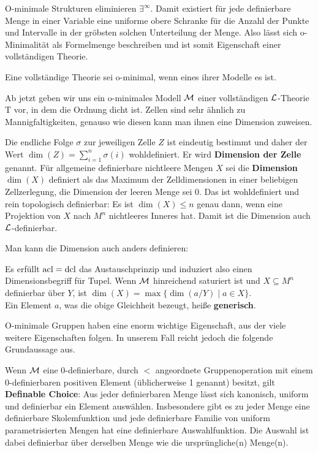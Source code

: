 \begin{corollary}
	O-minimale Strukturen eliminieren $\exists^\infty$. Damit existiert für jede definierbare Menge in einer Variable eine uniforme obere Schranke für die Anzahl der Punkte und Intervalle in der gröbsten solchen Unterteilung der Menge. Also lässt sich o-Minimalität als Formelmenge beschreiben und ist somit Eigenschaft einer vollständigen Theorie.
\end{corollary}

\begin{definition}
	Eine vollständige Theorie sei o-minimal, wenn eines ihrer Modelle es ist.
\end{definition}
\newpage
Ab jetzt geben wir uns ein o-minimales Modell $\mathcal{M}$ einer vollständigen $\mathcal{L}$-Theorie T vor, in dem die Ordnung dicht ist. Zellen sind sehr ähnlich zu Mannigfaltigkeiten, genauso wie diesen kann man ihnen eine Dimension zuweisen.
\begin{factdef}
	Die endliche Folge $\sigma$ zur jeweiligen Zelle $Z$ ist eindeutig bestimmt und daher der Wert $\dim(Z)=\sum\limits_{i=1}^n\sigma(i)$ wohldefiniert. Er wird \textbf{Dimension der Zelle} genannt. Für allgemeine definierbare nichtleere Mengen $X$ sei die \textbf{Dimension} $\dim(X)$ definiert als das Maximum der Zelldimensionen in einer beliebigen Zellzerlegung, die Dimension der leeren Menge sei 0. Das ist wohldefiniert und rein topologisch definierbar: Es ist $\dim(X)\leq n$ genau dann, wenn eine Projektion von $X$ nach $M^n$ nichtleeres Inneres hat. Damit ist die Dimension auch $\mathcal{L}$-definierbar.
\end{factdef}

Man kann die Dimension auch anders definieren:
\begin{factdef}
	Es erfüllt $\operatorname{acl}=\operatorname{dcl}$ das Austauschprinzip und induziert also einen Dimensionsbegriff für Tupel. Wenn $\mathcal{M}$ hinreichend saturiert ist und $X\subseteq M^n$ definierbar über $Y$, ist $\dim(X)=\max\{\dim(a/Y)\mid a\in X\}$.\\
	Ein Element $a$, was die obige Gleichheit bezeugt, heiße \textbf{generisch}.
\end{factdef}

O-minimale Gruppen haben eine enorm wichtige Eigenschaft, aus der viele weitere Eigenschaften folgen. In unserem Fall reicht jedoch die folgende Grundaussage aus.
\begin{fact}
	Wenn $\mathcal{M}$ eine 0-definierbare, durch $<$ angeordnete Gruppenoperation mit einem 0-definierbaren positiven Element (üblicherweise 1 genannt) besitzt, gilt \textbf{Definable Choice}: Aus jeder definierbaren Menge lässt sich kanonisch, uniform und definierbar ein Element auswählen. Insbesondere gibt es zu jeder Menge eine definierbare Skolemfunktion und jede definierbare Familie von uniform parametrisierten Mengen hat eine definierbare Auswahlfunktion. Die Auswahl ist dabei definierbar über derselben Menge wie die ursprüngliche(n) Menge(n).
\end{fact}

